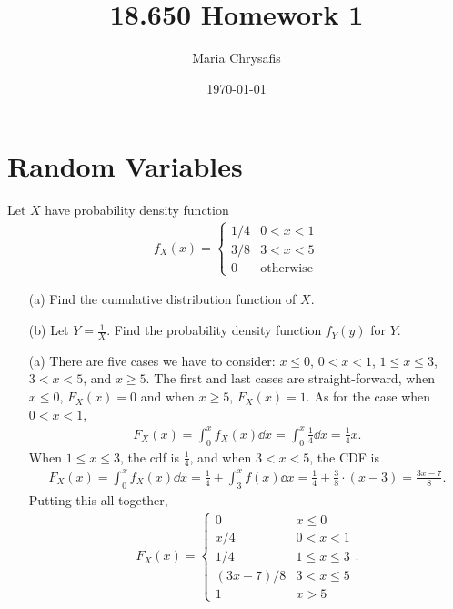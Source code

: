 \documentclass[a4paper]{article}
\author{Maria Chrysafis}
\date{\today}
\title{18.650 Homework 1}
\begin{document}
\maketitle
\section{Random Variables}
\begin{Exercise}
	
\end{Exercise}
\begin{Exercise}
\end{Exercise}
\begin{Exercise}
\end{Exercise}
\begin{Exercise}
	Let $X$ have probability density function
	\begin{align*}
		f_X(x) = \begin{cases}
			1/4 & 0 < x < 1 \\
			3/8 & 3 < x < 5 \\
			0 & \text{otherwise}
		\end{cases}
	\end{align*}
	\begin{itemize}
		\item[(a)] Find the cumulative distribution function of $X$.
		\item[(b)] Let $Y = \frac{1}{X}$. Find the probability density function $f_Y(y)$ for $Y$. 
	\end{itemize}
\end{Exercise}
\begin{Solution}
	\begin{itemize}
		\item[(a)] There are five cases we have to consider: $x \le 0$, $0 < x < 1$, $1 \le x \le 3$, $3 < x < 5$, and $x \ge 5$. The first and last cases are straight-forward, when $x \le 0$, $F_X(x) = 0$ and when $x \ge 5$, $F_X(x) = 1$. As for the case when $0 < x < 1$, 
			\begin{align*}
				F_X(x) = \int_{0}^{x} f_X(x) \dd x = \int_0^{x} \frac{1}{4} \dd x = \frac{1}{4} x.
			\end{align*}
			When $1 \le x \le 3$, the cdf is $\frac{1}{4}$, and when $3 < x < 5$, the CDF is 
			\begin{align*}
				F_X(x) = \int_0^{x} f_X(x) \dd x = \frac{1}{4} + \int_3^{x} f(x) \dd x = \frac{1}{4} + \frac{3}{8} \cdot(x - 3) = \frac{3x - 7}{8}.
			\end{align*}
			Putting this all together, 
			\begin{align*}
				F_X(x) = \begin{cases}
					0 & x \le 0 \\
					x/4 & 0 < x < 1 \\
					1/4 & 1 \le x \le 3 \\
					(3x - 7)/8 & 3 < x \le 5 \\
					1 & x > 5
				\end{cases}.
			\end{align*}

	\end{itemize}
\end{Solution}
\end{document}
